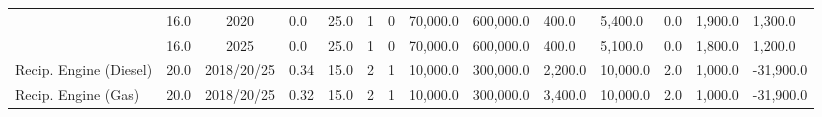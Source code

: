 \begin{table*}[]
\begin{tabularx}{\linewidth}{|p{}|l|c|l|l|l|l|l|l|l|l|l|l|l|}
& 16.0 & 2020 & 0.0 & 25.0 & 1 & 0 & 70,000.0 & 600,000.0 & 400.0 & 5,400.0 & 0.0 & 1,900.0 & 1,300.0 \\ \cline{2-14} 
& 16.0 & 2025 & 0.0 & 25.0 & 1 & 0 & 70,000.0 & 600,000.0 & 400.0 & 5,100.0 & 0.0 & 1,800.0 & 1,200.0 \\ \hline
Recip. Engine (Diesel) & 20.0 & 2018/20/25 & 0.34 & 15.0 & 2 & 1 & 10,000.0 & 300,000.0 & 2,200.0 & 10,000.0 & 2.0 & 1,000.0 & -31,900.0 \\ \hline
Recip. Engine (Gas) & 20.0 & 2018/20/25 & 0.32 & 15.0 & 2 & 1 & 10,000.0 & 300,000.0 & 3,400.0 & 10,000.0 & 2.0 & 1,000.0 & -31,900.0 \\ \hline

		\end{tabularx}
		\label{table:modern_plant_costs}
\end{table*}


